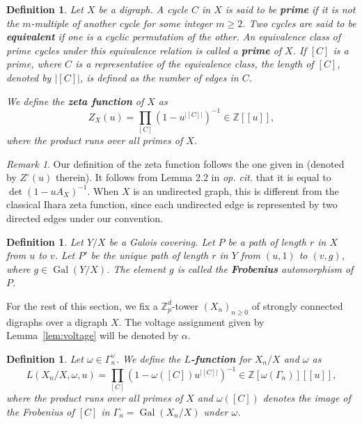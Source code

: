 \documentclass[11pt]{amsart}
\DeclareMathOperator{\Gal}{Gal}
\newtheorem{defn}[theorem]{Definition}
\numberwithin{equation}{section}
\theoremstyle{remark}
\newtheorem{remark}[theorem]{Remark}
\newcommand{\?}{\stackrel{?}{=}}
\newcommand{\ZZ}{\mathbb{Z}}
\newcommand{\Zp}{\mathbb{Z}_p}
\begin{document}
\begin{defn}
    Let $X$ be a digraph. A cycle $C$ in $X$ is said to be \textbf{prime} if it is not the $m$-multiple of another cycle for some integer $m\ge2$. Two cycles are said to be \textbf{equivalent} if one is a cyclic permutation of the other. An equivalence class of prime cycles under this equivalence relation is called a \textbf{prime} of $X$. If $[C]$ is a prime, where $C$ is a representative of the equivalence class, the length of $[C]$, denoted by $|[C]|$, is defined as the number of edges in $C$.

    We define the \textbf{zeta function} of $X$ as 
    \[
    Z_X(u)=\prod_{[C]}(1-u^{\vert [C]\vert})^{-1}\in\ZZ[[u]],
    \] where the product runs over all primes of $X$. 
\end{defn}
\begin{remark}
    Our definition of the zeta function follows the one given in \cite{ks} (denoted by $Z^\circ(u)$ therein). It follows from Lemma 2.2 in \textit{op. cit.} that it is equal to $\det(1-u A_X)^{-1}$. When $X$ is an undirected graph, this is different from the classical Ihara zeta function, since each undirected edge is represented by two directed edges under our convention.
\end{remark}

\begin{defn}
    Let $Y/X$ be a Galois covering. Let $P$ be a path of length $r$ in $X$ from $u$ to $v$. Let $P'$ be the unique path of length $r$  in $Y$ from $(u,1)$ to $(v,g)$, where $g\in \Gal(Y/X)$. The element $g$ is called the \textbf{Frobenius}  automorphism of $P$.
\end{defn}

For the rest of this section, we fix a $\Zp^d$-tower $(X_n)_{n\ge0}$ of strongly connected digraphs over a digraph $X$. The voltage assignment given by Lemma~\ref{lem:voltage} will be denoted by $\alpha$.

\begin{defn}
    Let $\omega\in\Gamma_n^\vee$. We define the \textbf{$L$-function} for $X_n/X$ and $\omega$ as
    \[L(X_n/X,\omega,u)=\prod_{[C]}(1-\omega([C])u^{\vert [C]\vert})^{-1}\in\ZZ[\omega(\Gamma_n)][[u]],\]
    where the product runs over all primes of $X$ and $\omega([C])$ denotes the image of the Frobenius of $[C]$ in $\Gamma_n=\Gal(X_n/X)$ under $\omega$.
\end{defn}
\end{document}
